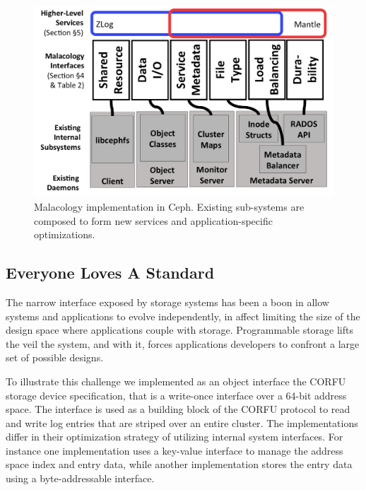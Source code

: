 \begin{figure}[th]
\centering
\includegraphics[width=1.0\linewidth]{implementation-overview.png}
\caption{Malacology implementation in Ceph. Existing sub-systems are composed
    to form new services and application-specific optimizations.}
\label{fig:malacology}
\end{figure}

\subsection{Everyone Loves A Standard}

The narrow interface exposed by storage systems has been a boon in allow
systems and applications to evolve independently, in affect limiting the size
of the design space where applications couple with storage. Programmable
storage lifts the veil the system, and with it, forces applications developers
to confront a large set of possible designs.

To illustrate this challenge we implemented as an object interface the CORFU
storage device specification, that is a write-once interface over a 64-bit
address space. The interface is used as a building block of the CORFU protocol
to read and write log entries that are striped over an entire cluster. 
The implementations differ in their optimization strategy of utilizing
internal system interfaces. For instance one implementation uses a key-value
interface to manage the address space index and entry data, while another
implementation stores the entry data using a byte-addressable interface.

